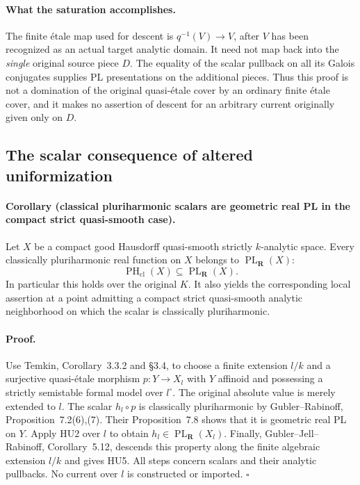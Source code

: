 \paragraph{What the saturation accomplishes.}
The finite \'etale map used for descent is
$q^{-1}(V)\to V$, after $V$ has been recognized as an actual target
analytic domain.  It need not map back into the \emph{single}
original source piece $D$.  The equality of the scalar pullback on
all its Galois conjugates supplies PL presentations on the additional
pieces.  Thus this proof is not a domination of the original
quasi-\'etale cover by an ordinary finite \'etale cover, and it makes
no assertion of descent for an arbitrary current originally given
only on $D$.

\subsection{The scalar consequence of altered uniformization}

\paragraph{Corollary (classical pluriharmonic scalars are geometric
real PL in the compact strict quasi-smooth case).}
Let $X$ be a compact good Hausdorff quasi-smooth strictly
$k$-analytic space.  Every classically pluriharmonic real function
on $X$ belongs to $\operatorname{PL}_{\mathbf R}(X)$:
\[
 \operatorname{PH}_{\mathrm{cl}}(X)
       \subseteq\operatorname{PL}_{\mathbf R}(X).       \tag{HU5}
\]
In particular this holds over the original $K$.  It also yields the
corresponding local assertion at a point admitting a compact strict
quasi-smooth analytic neighborhood on which the scalar is
classically pluriharmonic.

\paragraph{Proof.}
Use Temkin, Corollary~3.3.2 and \S3.4, to choose a finite extension
$l/k$ and a surjective quasi-\'etale morphism
$p:Y\to X_l$ with $Y$ affinoid and possessing a strictly semistable
formal model over $l^\circ$.  The original absolute value is merely
extended to $l$.  The scalar
$h_l\circ p$ is classically pluriharmonic by
Gubler--Rabinoff, Proposition~7.2(6),(7).  Their Proposition~7.8
shows that it is geometric real PL on $Y$.  Apply HU2 over $l$ to
obtain $h_l\in\operatorname{PL}_{\mathbf R}(X_l)$.  Finally,
Gubler--Jell--Rabinoff, Corollary~5.12, descends this property along
the finite algebraic extension $l/k$ and gives HU5.
All steps concern scalars and their analytic pullbacks.  No current
over $l$ is constructed or imported. \hfill$\square$

